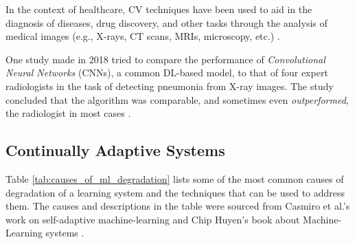 \documentclass[../main.tex]{subfiles}
\begin{document}
    In the context of healthcare, CV techniques have been used to aid in the diagnosis of diseases, drug discovery, and other tasks through the analysis of medical images (e.g., X-rays, CT scans, MRIs, microscopy, etc.) \cite{esteva_deep_2021}. 
    
    One study made in 2018 tried to compare the performance of  \textit{Convolutional Neural Networks} (CNNs), a common DL-based model, to that of four expert radiologists in the task of detecting pneumonia from X-ray images. The study concluded that the algorithm was comparable, and sometimes even \textit{outperformed}, the radiologist in most cases \cite{wang_chestx-ray8_2017}.

    

    \subsection{Continually Adaptive Systems} \label{sec:continually_adaptive_systems}

    Table \ref{tab:causes_of_ml_degradation} lists some of the most common causes of degradation of a learning system and the techniques that can be used to address them. The causes and descriptions in the table were sourced from Casmiro et al.'s work on self-adaptive machine-learning \cite{casimiro_self-adaptive_2022} and Chip Huyen's book about Machine-Learning systems \cite{huyen_designing_2022} \cite{casimiro_self-adaptive_2022}.
\end{document}
